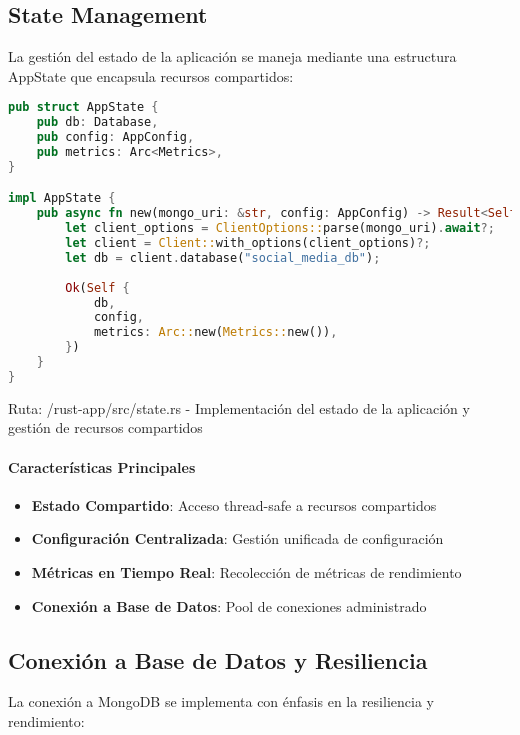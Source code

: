 \documentclass[12pt,letterpaper]{article}
\begin{document}
\subsection{State Management}
La gestión del estado de la aplicación se maneja mediante una estructura AppState que encapsula recursos compartidos:

\begin{lstlisting}[language=rust]
pub struct AppState {
    pub db: Database,
    pub config: AppConfig,
    pub metrics: Arc<Metrics>,
}

impl AppState {
    pub async fn new(mongo_uri: &str, config: AppConfig) -> Result<Self, AppError> {
        let client_options = ClientOptions::parse(mongo_uri).await?;
        let client = Client::with_options(client_options)?;
        let db = client.database("social_media_db");
        
        Ok(Self {
            db,
            config,
            metrics: Arc::new(Metrics::new()),
        })
    }
}
\end{lstlisting}
\small{Ruta: /rust-app/src/state.rs - Implementación del estado de la aplicación y gestión de recursos compartidos}

\paragraph{Características Principales}
\begin{itemize}
    \item \textbf{Estado Compartido}: Acceso thread-safe a recursos compartidos
    \item \textbf{Configuración Centralizada}: Gestión unificada de configuración
    \item \textbf{Métricas en Tiempo Real}: Recolección de métricas de rendimiento
    \item \textbf{Conexión a Base de Datos}: Pool de conexiones administrado
\end{itemize}

\subsection{Conexión a Base de Datos y Resiliencia}
La conexión a MongoDB se implementa con énfasis en la resiliencia y rendimiento:
\end{document}
